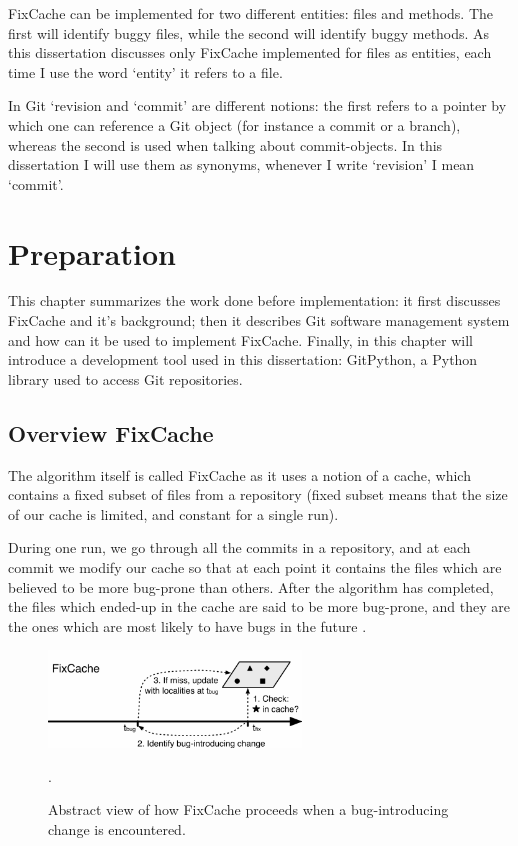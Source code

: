 \documentclass[12pt,twoside,notitlepage]{report}
\newcommand{\fxch}{FixCache}
\begin{document}
\fxch{} can be implemented for two different entities: files and methods. The first will identify buggy files, while the second will identify buggy methods. As this dissertation discusses only \fxch{} implemented for files as entities, each time I use the word `entity' it refers to a file.

In Git `revision and `commit' are different notions: the first refers to a pointer by which one can reference a Git object (for instance a commit or a branch), whereas the second is used when talking about commit-objects. In this dissertation I will use them as synonyms, whenever I write `revision' I mean `commit'.
\cleardoublepage
\chapter{Preparation}
This chapter summarizes the work done before implementation: it first discusses \fxch{} and it's background; then it describes Git \cite{TorvaldsGit} software management system and how can it be used to implement \fxch{}. Finally, in this chapter will introduce a development tool used in this dissertation: GitPython, a Python library used to access Git repositories.
\section{Overview \fxch{}}
The algorithm itself is called \fxch{} as it uses a notion of a cache, which contains a fixed subset of files from a repository (fixed subset means that the size of our cache is limited, and constant for a single run). 

During one run, we go through all the commits in a repository, and at each commit we modify our cache so that at each point it contains the files which are believed to be more bug-prone than others. After the algorithm has completed, the files which ended-up in the cache are said to be more bug-prone, and they are the ones which are most likely to have bugs in the future \cite{FixCache}.
\clearpage
\begin{figure}[h]
\includegraphics[width=0.6\textwidth]{fixcache_figure.png}
\centering
\captionsetup{width=0.6\textwidth}
\caption{Abstract view of how \fxch{} proceeds when a bug-introducing change is encountered.}.
\label{fixcache_figure}
\end{figure}
\end{document}
